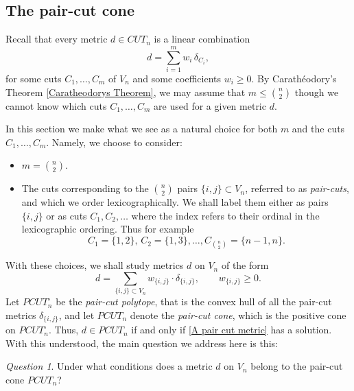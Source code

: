 \documentclass[12pt]{amsart}
\numberwithin{theorem}{section}
\theoremstyle{remark}
\newtheorem{question}{Question}
\begin{document}
\subsection{The pair-cut cone}
Recall that every metric $d\in CUT_n$ is a linear combination 
$$ d = \sum_{i=1}^m w_i\,  \delta_{C_i}, $$
for some cuts $C_1,\dots, C_m$ of $V_n$ and some coefficients $w_i\ge 0$. By Carath\'eodory's Theorem \ref{Caratheodorys Theorem}, we may assume that $m\le {n \choose 2}$ though we cannot know which cuts $C_1,\dots, C_m$ are used for a given metric $d$. 

In this section we make what we see as a natural choice for both $m$ and the cuts $C_1, \dots, C_m$. Namely, we choose to consider:
\begin{itemize}
\item[(i)] $m = {n \choose 2}$.
\item[(ii)] The cuts corresponding to the ${n \choose 2}$ pairs $\{i,j\}\subset V_n$, referred to as {\em pair-cuts}, and which we order lexicographically. We shall label them either as pairs $\{i,j\}$ or as cuts $C_1, C_2, \dots$ where the index refers to their ordinal in the lexicographic ordering. Thus for example 
$$C_1 =\{1,2\}, \,  C_2 = \{1,3\}, \dots , C_{{n\choose 2}} = 
\{n-1,n\}.$$ 
\end{itemize}
With these choices, we shall study metrics $d$ on $V_n$ of the form 
\begin{equation} \label{A pair cut metric}
	d = \sum_{\{i,j\} \subset V_n} w_{\{i,j\}}\cdot \delta_{\{i,j\}}, \qquad w_{\{i,j\}} \ge 0. 
\end{equation}   
Let $PCUT_n^\square$ be the {\em pair-cut polytope}, that is the convex hull of all the pair-cut metrics $\delta_{\{i,j\}}$, and let $PCUT_n$ denote the {\em pair-cut cone}, which is the positive cone on $PCUT^\square _n$. Thus, $d\in PCUT_n$ if and only if \eqref{A pair cut metric} has a solution. With this understood, the main question we address here is this:
\begin{question} \label{Question about a metric belonging to the pair-cut cone}
Under what conditions does a metric $d$ on $V_n$ belong to the pair-cut cone $PCUT_n$? 	
\end{question} 
\end{document}
